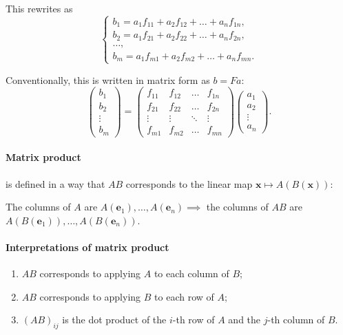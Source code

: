 \documentclass{article}
\begin{document}
This rewrites as
$$
\begin{cases}
b_1 = a_1 f_{11} + a_2 f_{12} + \dots + a_n f_{1n}, \\
b_2 = a_1 f_{21} + a_2 f_{22} + \dots + a_n f_{2n}, \\
\dots, \\
b_m = a_1 f_{m1} + a_2 f_{m2} + \dots + a_n f_{mn}.
\end{cases}
$$

Conventionally, this is written in matrix form as $b = Fa$:
$$
\begin{pmatrix}
b_1 \\ b_2 \\ \vdots \\ b_m
\end{pmatrix} = 
\begin{pmatrix}
f_{11} & f_{12} & \dots & f_{1n} \\
f_{21} & f_{22} & \dots & f_{2n} \\
\vdots & \vdots & \ddots & \vdots \\
f_{m1} & f_{m2} & \dots & f_{mn}
\end{pmatrix} \begin{pmatrix}
a_1 \\ a_2 \\ \vdots \\ a_n
\end{pmatrix}.
$$

\paragraph{Matrix product} is defined in a way that $AB$ corresponds to the linear map $\mathbf x \mapsto A(B(\mathbf x))$:

The columns of $A$ are $A (\mathbf e_1), \dots, A (\mathbf e_n) \implies$ the columns of $AB$ are $A(B(\mathbf e_1)), \dots, A(B(\mathbf e_n))$.

\paragraph{Interpretations of matrix product}
\begin{enumerate}
    \item $AB$ corresponds to applying $A$ to each column of $B$;
    \item $AB$ corresponds to applying $B$ to each row of $A$;
    \item $(AB)_{ij}$ is the dot product of the $i$-th row of $A$ and the $j$-th column of $B$.
\end{enumerate}
\end{document}
